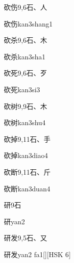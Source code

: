 \begin{Entry}{砍伤}{9,6}{⽯、⼈}
  \begin{Phonetics}{砍伤}{kan3shang1}
  \end{Phonetics}
\end{Entry}

\begin{Entry}{砍杀}{9,6}{⽯、⽊}
  \begin{Phonetics}{砍杀}{kan3sha1}
  \end{Phonetics}
\end{Entry}

\begin{Entry}{砍死}{9,6}{⽯、⽍}
  \begin{Phonetics}{砍死}{kan3si3}
  \end{Phonetics}
\end{Entry}

\begin{Entry}{砍树}{9,9}{⽯、⽊}
  \begin{Phonetics}{砍树}{kan3shu4}
  \end{Phonetics}
\end{Entry}

\begin{Entry}{砍掉}{9,11}{⽯、⼿}
  \begin{Phonetics}{砍掉}{kan3diao4}
  \end{Phonetics}
\end{Entry}

\begin{Entry}{砍断}{9,11}{⽯、⽄}
  \begin{Phonetics}{砍断}{kan3duan4}
  \end{Phonetics}
\end{Entry}

\begin{Entry}{研}{9}{⽯}
  \begin{Phonetics}{研}{yan2}
  \end{Phonetics}
\end{Entry}

\begin{Entry}{研发}{9,5}{⽯、⼜}
  \begin{Phonetics}{研发}{yan2 fa1}[][HSK 6]
  \end{Phonetics}
\end{Entry}

